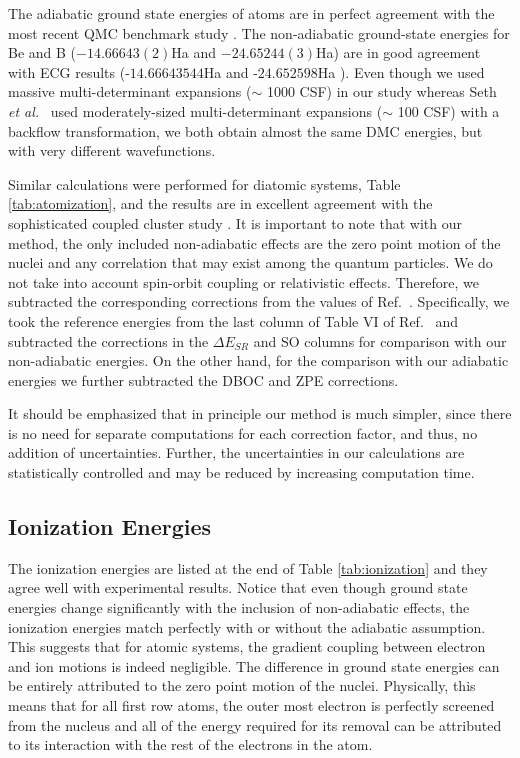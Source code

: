 \documentclass[pra,superscriptaddress,groupedaddress,twocolumn]{revtex4}
\begin{document}
The adiabatic ground state energies of atoms are in perfect agreement with the most recent QMC benchmark study \cite{Seth_Bench}. The non-adiabatic ground-state energies for Be and B ($-14.66643(2)$Ha and $-24.65244(3)$Ha) are in good agreement with ECG results (-$14.66643544$Ha \cite{Bubin_BeH_noBO} and -$24.652598$Ha \cite{Bubin_BH_noBO}). Even though we used massive multi-determinant expansions ($\sim$ 1000 CSF) in our study whereas Seth {\it et al.}~\cite{Seth_Bench} used moderately-sized multi-determinant expansions ($\sim$ 100 CSF) with a backflow transformation,  we both obtain almost the same DMC energies, but with very different wavefunctions.

Similar calculations were performed for diatomic systems, Table \ref{tab:atomization}, and the results are in excellent agreement with the sophisticated coupled cluster study \cite{Feller_Corrections}. It is important to note that with our method, the only included non-adiabatic effects are the zero point motion of the nuclei and any correlation that may exist among the quantum particles. We do not take into account spin-orbit coupling or relativistic effects. Therefore, we subtracted the corresponding corrections from the values of Ref.~\cite{Feller_Corrections}. Specifically, we took the reference energies from the last column of Table VI of Ref.~\cite{Feller_Corrections} and subtracted the corrections in the $\Delta E_{SR}$ and SO columns for comparison with our non-adiabatic energies. On the other hand, for the comparison with our adiabatic energies we further subtracted the DBOC and ZPE corrections.

It should be emphasized that in principle our method is much simpler, since there is no need for separate computations for each correction factor, and thus, no addition of uncertainties. Further, the uncertainties in our calculations are statistically controlled and may be reduced by increasing computation time. 

\subsection{Ionization Energies}
The ionization energies are listed at the end of Table \ref{tab:ionization} and they agree well with experimental results. Notice that even though ground state energies change significantly with the inclusion of non-adiabatic effects, the ionization energies match perfectly with or without the adiabatic assumption. This suggests that for atomic systems, the gradient coupling between electron and ion motions is indeed negligible. The difference in ground state energies can be entirely attributed to the zero point motion of the nuclei. Physically, this means that for all first row atoms, the outer most electron is perfectly screened from the nucleus and all of the energy required for its removal can be attributed to its interaction with the rest of the electrons in the atom.
\end{document}
